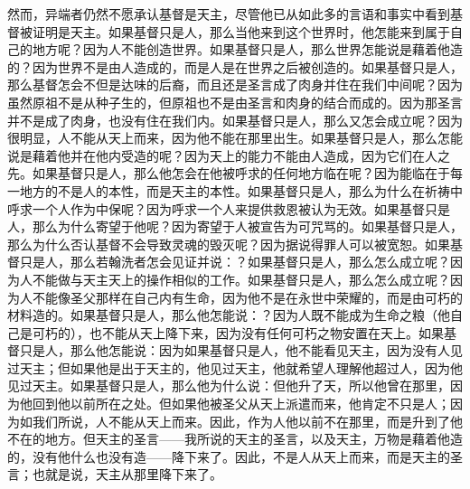 然而，异端者仍然不愿承认基督是天主，尽管他已从如此多的言语和事实中看到基督被证明是天主。如果基督只是人，那么当他来到这个世界时，他怎能来到属于自己的地方呢？因为人不能创造世界。如果基督只是人，那么世界怎能说是藉着他造的？因为世界不是由人造成的，而是人是在世界之后被创造的。如果基督只是人，那么基督怎会不但是达味的后裔，而且还是圣言成了肉身并住在我们中间呢？因为虽然原祖不是从种子生的，但原祖也不是由圣言和肉身的结合而成的。因为那圣言并不是成了肉身，也没有住在我们内。如果基督只是人，那么又怎会成立呢？因为很明显，人不能从天上而来，因为他不能在那里出生。如果基督只是人，那么怎能说是藉着他并在他内受造的呢？因为天上的能力不能由人造成，因为它们在人之先。如果基督只是人，那么他怎会在他被呼求的任何地方临在呢？因为能临在于每一地方的不是人的本性，而是天主的本性。如果基督只是人，那么为什么在祈祷中呼求一个人作为中保呢？因为呼求一个人来提供救恩被认为无效。如果基督只是人，那么为什么寄望于他呢？因为寄望于人被宣告为可咒骂的。如果基督只是人，那么为什么否认基督不会导致灵魂的毁灭呢？因为据说得罪人可以被宽恕。如果基督只是人，那么若翰洗者怎会见证并说：？如果基督只是人，那么怎么成立呢？因为人不能做与天主天上的操作相似的工作。如果基督只是人，那么怎么成立呢？因为人不能像圣父那样在自己内有生命，因为他不是在永世中荣耀的，而是由可朽的材料造的。如果基督只是人，那么他怎能说：？因为人既不能成为生命之粮（他自己是可朽的），也不能从天上降下来，因为没有任何可朽之物安置在天上。如果基督只是人，那么他怎能说：因为如果基督只是人，他不能看见天主，因为没有人见过天主；但如果他是出于天主的，他见过天主，他就希望人理解他超过人，因为他见过天主。如果基督只是人，那么他为什么说：但他升了天，所以他曾在那里，因为他回到他以前所在之处。但如果他被圣父从天上派遣而来，他肯定不只是人；因为如我们所说，人不能从天上而来。因此，作为人他以前不在那里，而是升到了他不在的地方。但天主的圣言——我所说的天主的圣言，以及天主，万物是藉着他造的，没有他什么也没有造——降下来了。因此，不是人从天上而来，而是天主的圣言；也就是说，天主从那里降下来了。\par


